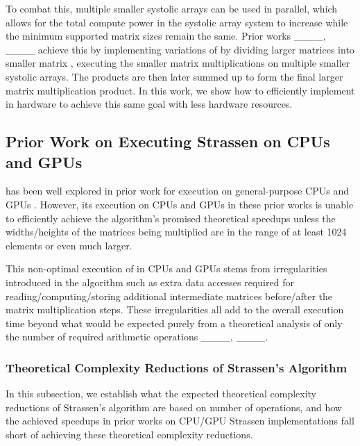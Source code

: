 To combat this, multiple smaller systolic arrays can be used in parallel, which allows for the total compute power in the systolic array system to increase while the minimum supported matrix sizes remain the same.
Prior works ____, ____ achieve this by implementing variations of  by dividing larger matrices into smaller matrix \blocks, executing the smaller matrix \block multiplications on multiple smaller systolic arrays.
The \block products are then later summed up to form the final larger matrix multiplication product.
In this work, we show how to efficiently implement \seq in hardware to achieve this same goal with less hardware resources.

\subsection{Prior Work on Executing Strassen on CPUs and GPUs}
\sa has been well explored in prior work for execution on general-purpose CPUs and GPUs \citeCpu.
However, its execution on CPUs and GPUs in these prior works is unable to efficiently achieve the algorithm's promised theoretical speedups unless the widths/heights of the matrices being multiplied are in the range of at least 1024 elements or even much larger.

This non-optimal execution of \sa in CPUs and GPUs stems from irregularities introduced in the algorithm such as extra data accesses required for reading/computing/storing additional intermediate matrices before/after the matrix multiplication steps.
These irregularities all add to the overall execution time beyond what would be expected purely from a theoretical analysis of only the number of required arithmetic operations ____, ____.

\subsubsection{Theoretical Complexity Reductions of Strassen's Algorithm}
\label{smm:sec:theoretical-complexity}
In this subsection, we establish what the expected theoretical complexity reductions of Strassen's algorithm are based on number of operations, and how the achieved speedups in prior works on CPU/GPU Strassen implementations fall short of achieving these theoretical complexity reductions.

